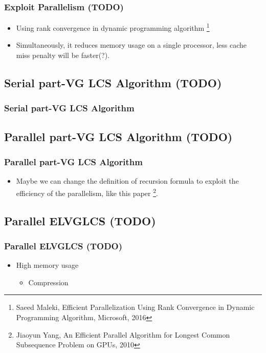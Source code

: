 \begin{frame}
	\frametitle{Exploit Parallelism (TODO)}
	\begin{itemize}
		\setlength\itemsep{1em}
		\item Using rank convergence in dynamic programming algorithm
			\footnote{Saeed Maleki, Efficient Parallelization Using Rank Convergence in 
				Dynamic Programming Algorithm, Microsoft, 2016}
		\item Simultaneously, it reduces memory usage on a single processor,
			less cache miss penalty will be faster(?).
	\end{itemize}
\end{frame}

\subsection{Serial part-VG LCS Algorithm (TODO)}
\begin{frame}
	\frametitle{Serial part-VG LCS Algorithm}
\end{frame}

\subsection{Parallel part-VG LCS Algorithm (TODO)}
\begin{frame}
	\frametitle{Parallel part-VG LCS Algorithm}
	\begin{itemize}
		\item Maybe we can change the definition of recursion formula to exploit the efficiency of the parallelism, like this paper
		\footnote{Jiaoyun Yang, An Efficient Parallel Algorithm for Longest Common Subsequence Problem on GPUs, 2010}.
	\end{itemize}
\end{frame}

\subsection{Parallel ELVGLCS (TODO)}
\begin{frame}
	\frametitle{Parallel ELVGLCS (TODO)}
	\begin{itemize}
		\item High memory usage 
			\begin{itemize}
				\item Compression
			\end{itemize}
	\end{itemize}
\end{frame}

